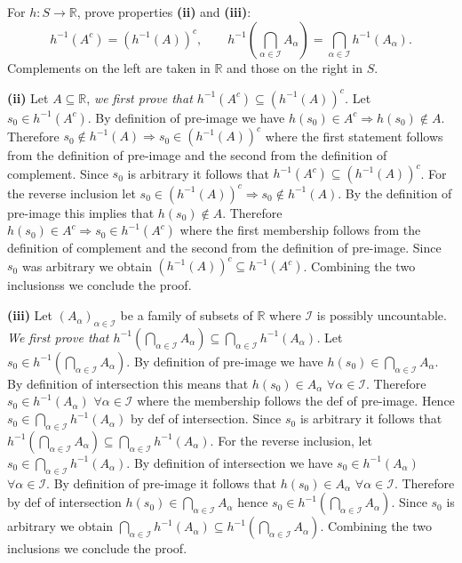 \documentclass[11pt,a4paper]{article}
\newcommand{\studyheading}[1]{{\color{StudyBlue}\normalfont\bfseries\boldmath #1}}
\newcommand{\studylabel}[1]{\textcolor{StudyBlue}{\textnormal{\bfseries #1}}}
\begin{document}
For $h:S\to\mathbb R$, prove properties \studylabel{(ii)} and \studylabel{(iii)}:
\[
h^{-1}(A^c)=(h^{-1}(A))^c,\qquad
h^{-1}\left(\bigcap_{\alpha\in\mathcal I}A_\alpha\right)=\bigcap_{\alpha\in\mathcal I}h^{-1}(A_\alpha).
\]
Complements on the left are taken in $\mathbb R$ and those on the right in $S$.
\par\noindent\studyheading{Proof.}\par\nobreak
\studylabel{(ii)} Let $A\subseteq\mathbb R$, \emph{we first prove that $h^{-1}(A^c)\subseteq(h^{-1}(A))^c$.}
Let $s_0\in h^{-1}(A^c)$.
By definition of pre-image we have $h(s_0)\in A^c\Rightarrow h(s_0)\notin A$.
Therefore $s_0\notin h^{-1}(A)\Rightarrow s_0\in(h^{-1}(A))^c$ where the first statement follows from the definition of pre-image and the second from the definition of complement.
Since $s_0$ is arbitrary it follows that $h^{-1}(A^c)\subseteq(h^{-1}(A))^c$.
For the reverse inclusion let $s_0\in(h^{-1}(A))^c\Rightarrow s_0\notin h^{-1}(A)$.
By the definition of pre-image this implies that $h(s_0)\notin A$.
Therefore $h(s_0)\in A^c\Rightarrow s_0\in h^{-1}(A^c)$ where the first membership follows from the definition of complement and the second from the definition of pre-image.
Since $s_0$ was arbitrary we obtain $(h^{-1}(A))^c\subseteq h^{-1}(A^c)$.
Combining the two inclusionss we conclude the proof.

\studylabel{(iii)}
Let $(A_\alpha)_{\alpha\in\mathcal I}$ be a family of subsets of $\mathbb R$ where $\mathcal I$ is possibly uncountable.
\emph{We first prove that $h^{-1}(\bigcap_{\alpha\in\mathcal I}A_\alpha)\subseteq\bigcap_{\alpha\in\mathcal I}h^{-1}(A_\alpha)$.}
Let $s_0\in h^{-1}(\bigcap_{\alpha\in\mathcal I}A_\alpha)$.
By definition of pre-image we have $h(s_0)\in\bigcap_{\alpha\in\mathcal I}A_\alpha$.
By definition of intersection this means that $h(s_0)\in A_\alpha$ $\forall\alpha\in\mathcal I$.
Therefore $s_0\in h^{-1}(A_\alpha)$ $\forall\alpha\in\mathcal I$ where the membership follows the def of pre-image.
Hence $s_0\in\bigcap_{\alpha\in\mathcal I}h^{-1}(A_\alpha)$ by def of intersection.
Since $s_0$ is arbitrary it follows that $h^{-1}(\bigcap_{\alpha\in\mathcal I}A_\alpha)\subseteq\bigcap_{\alpha\in\mathcal I}h^{-1}(A_\alpha)$.
For the reverse inclusion, let $s_0\in\bigcap_{\alpha\in\mathcal I}h^{-1}(A_\alpha)$.
By definition of intersection we have $s_0\in h^{-1}(A_\alpha)$ $\forall\alpha\in\mathcal I$.
By definition of pre-image it follows that $h(s_0)\in A_\alpha$ $\forall\alpha\in\mathcal I$.
Therefore by def of intersection $h(s_0)\in\bigcap_{\alpha\in\mathcal I}A_\alpha$ hence $s_0\in h^{-1}(\bigcap_{\alpha\in\mathcal I}A_\alpha)$.
Since $s_0$ is arbitrary we obtain $\bigcap_{\alpha\in\mathcal I}h^{-1}(A_\alpha)\subseteq h^{-1}(\bigcap_{\alpha\in\mathcal I}A_\alpha)$.
Combining the two inclusions we conclude the proof.
%
\end{document}
